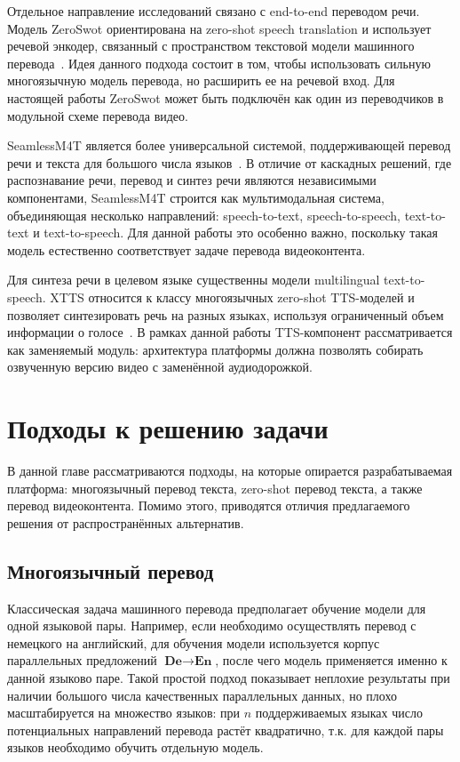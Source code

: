 \documentclass[a4paper,article,14pt]{extarticle}
\begin{document}
Отдельное направление исследований связано с end-to-end переводом речи. Модель ZeroSwot ориентирована на zero-shot speech translation и использует речевой энкодер, связанный с пространством текстовой модели машинного перевода~\cite{ZeroSwot}. Идея данного подхода состоит в том, чтобы использовать сильную многоязычную модель перевода, но расширить ее на речевой вход. Для настоящей работы ZeroSwot может быть подключён как один из переводчиков в модульной схеме перевода видео.

SeamlessM4T является более универсальной системой, поддерживающей перевод речи и текста для большого числа языков~\cite{SeamlessM4T}. В отличие от каскадных решений, где распознавание речи, перевод и синтез речи являются независимыми компонентами, SeamlessM4T строится как мультимодальная система, объединяющая несколько направлений: speech-to-text, speech-to-speech, text-to-text и text-to-speech. Для данной работы это особенно важно, поскольку такая модель естественно соответствует задаче перевода видеоконтента.

Для синтеза речи в целевом языке существенны модели multilingual text-to-speech. XTTS относится к классу многоязычных zero-shot TTS-моделей и позволяет синтезировать речь на разных языках, используя ограниченный объем информации о голосе~\cite{XTTS}. В рамках данной работы TTS-компонент рассматривается как заменяемый модуль: архитектура платформы должна позволять собирать озвученную версию видео с заменённой аудиодорожкой.

\newpage
\section{Подходы к решению задачи}

В данной главе рассматриваются подходы, на которые опирается разрабатываемая платформа: многоязычный перевод текста, zero-shot перевод текста, а также перевод видеоконтента. Помимо этого, приводятся отличия предлагаемого решения от распространённых альтернатив.

\subsection{Многоязычный перевод}

Классическая задача машинного перевода предполагает обучение модели для одной языковой пары. Например, если необходимо осуществлять перевод с немецкого на английский, для обучения модели используется корпус параллельных предложений $\textbf{De}\!\rightarrow\!\textbf{En}$, после чего модель применяется именно к данной языково паре. Такой простой подход показывает неплохие результаты при наличии большого числа качественных параллельных данных, но плохо масштабируется на множество языков: при $n$ поддерживаемых языках число потенциальных направлений перевода растёт квадратично, т.к. для каждой пары языков необходимо обучить отдельную модель.
\end{document}
